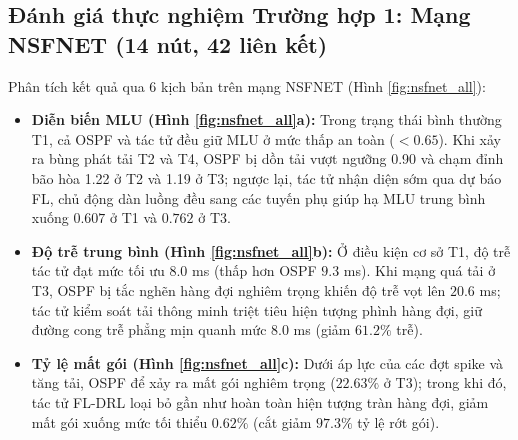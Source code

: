 \documentclass[11pt,a4paper]{article}
\begin{document}
\subsection*{Đánh giá thực nghiệm Trường hợp 1: Mạng NSFNET (14 nút, 42 liên kết)}
Phân tích kết quả qua 6 kịch bản trên mạng NSFNET (Hình \ref{fig:nsfnet_all}):
\begin{itemize}[leftmargin=1.5em, itemsep=0.3ex]
    \item \textbf{Diễn biến MLU (Hình \ref{fig:nsfnet_all}a):} Trong trạng thái bình thường T1, cả OSPF và tác tử đều giữ MLU ở mức thấp an toàn ($< 0.65$). Khi xảy ra bùng phát tải T2 và T4, OSPF bị dồn tải vượt ngưỡng 0.90 và chạm đỉnh bão hòa 1.22 ở T2 và 1.19 ở T3; ngược lại, tác tử nhận diện sớm qua dự báo FL, chủ động dàn luồng đều sang các tuyến phụ giúp hạ MLU trung bình xuống $0.607$ ở T1 và $0.762$ ở T3.
    \item \textbf{Độ trễ trung bình (Hình \ref{fig:nsfnet_all}b):} Ở điều kiện cơ sở T1, độ trễ tác tử đạt mức tối ưu $8.0$ ms (thấp hơn OSPF $9.3$ ms). Khi mạng quá tải ở T3, OSPF bị tắc nghẽn hàng đợi nghiêm trọng khiến độ trễ vọt lên $20.6$ ms; tác tử kiểm soát tải thông minh triệt tiêu hiện tượng phình hàng đợi, giữ đường cong trễ phẳng mịn quanh mức $8.0$ ms (giảm $61.2\%$ trễ).
    \item \textbf{Tỷ lệ mất gói (Hình \ref{fig:nsfnet_all}c):} Dưới áp lực của các đợt spike và tăng tải, OSPF để xảy ra mất gói nghiêm trọng ($22.63\%$ ở T3); trong khi đó, tác tử FL-DRL loại bỏ gần như hoàn toàn hiện tượng tràn hàng đợi, giảm mất gói xuống mức tối thiểu $0.62\%$ (cắt giảm $97.3\%$ tỷ lệ rớt gói).
\end{itemize}
\end{document}
